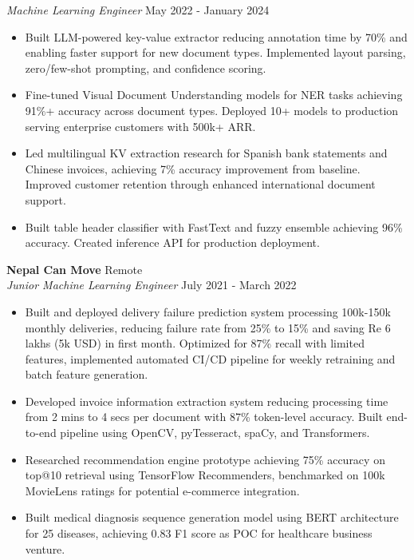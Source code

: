\documentclass[a4paper]{article}
\begin{document}
\textit{Machine Learning Engineer} \hfill May 2022 - January 2024\\
\vspace{-1mm}
\begin{itemize} \itemsep 0pt
	\item Built LLM-powered key-value extractor reducing annotation time by 70\% and enabling faster support for new document types. Implemented layout parsing, zero/few-shot prompting, and confidence scoring.
	\item Fine-tuned Visual Document Understanding models for NER tasks achieving 91\%+ accuracy across document types. Deployed 10+ models to production serving enterprise customers with 500k+ ARR.
	\item Led multilingual KV extraction research for Spanish bank statements and Chinese invoices, achieving 7\% accuracy improvement from baseline. Improved customer retention through enhanced international document support.
	\item Built table header classifier with FastText and fuzzy ensemble achieving 96\% accuracy. Created inference API for production deployment.
\end{itemize}

\textbf{Nepal Can Move} \hfill Remote\\
\textit{Junior Machine Learning Engineer} \hfill July 2021 - March 2022\\
\vspace{-1mm}
\begin{itemize} \itemsep 0pt
	\item Built and deployed delivery failure prediction system processing 100k-150k monthly deliveries, reducing failure rate from 25\% to 15\% and saving Re 6 lakhs (5k USD) in first month. Optimized for 87\% recall with limited features, implemented automated CI/CD pipeline for weekly retraining and batch feature generation.
	\item Developed invoice information extraction system reducing processing time from 2 mins to 4 secs per document with 87\% token-level accuracy. Built end-to-end pipeline using OpenCV, pyTesseract, spaCy, and Transformers.
	\item Researched recommendation engine prototype achieving 75\% accuracy on top@10 retrieval using TensorFlow Recommenders, benchmarked on 100k MovieLens ratings for potential e-commerce integration.
	\item Built medical diagnosis sequence generation model using BERT architecture for 25 diseases, achieving 0.83 F1 score as POC for healthcare business venture.
\end{itemize}
\end{document}
